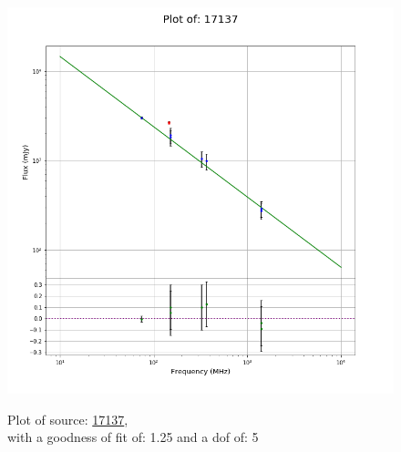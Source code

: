 \documentclass{article}
\begin{document}
\begin{figure}[H]
    \centering
    \begin{minipage}{.5\textwidth}
        \centering
        \includegraphics[scale = 0.35]{KmeulenTrap4P23_1min/1min17137.png}
        \captionsetup{labelformat=empty}
        \caption{Plot of source: \href{http://banana.transientskp.org/r4/vlo_KmeulenTrap4P23/runningcatalog/17137}{17137},\\with a goodness of fit of: 1.25 and a dof of: 5}
        \addtocounter{figure}{-1}
        \label{KmeulenTrap4P23:1min:17137:plot}
    \end{minipage}%
    \begin{minipage}{0.5\textwidth}
        \centering


\end{minipage}
\end{figure}
\end{document}
